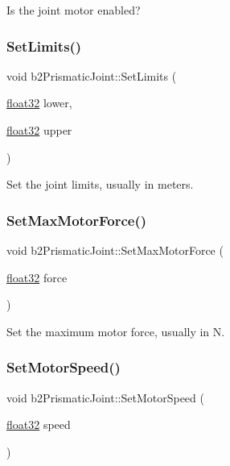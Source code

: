 Is the joint motor enabled? 

\mbox{\label{classb2_prismatic_joint_a82a220e6d5a212c1924882e0855b0bef}} 
\subsubsection{\texorpdfstring{SetLimits()}{SetLimits()}}
{\footnotesize\ttfamily void b2\+Prismatic\+Joint\+::\+Set\+Limits (\begin{DoxyParamCaption}\item[{\mbox{\hyperlink{b2_settings_8h_aacdc525d6f7bddb3ae95d5c311bd06a1}{float32}}}]{lower,  }\item[{\mbox{\hyperlink{b2_settings_8h_aacdc525d6f7bddb3ae95d5c311bd06a1}{float32}}}]{upper }\end{DoxyParamCaption})}



Set the joint limits, usually in meters. 

\mbox{\label{classb2_prismatic_joint_aa7817474aef15ca4815341479ac590e2}} 
\subsubsection{\texorpdfstring{SetMaxMotorForce()}{SetMaxMotorForce()}}
{\footnotesize\ttfamily void b2\+Prismatic\+Joint\+::\+Set\+Max\+Motor\+Force (\begin{DoxyParamCaption}\item[{\mbox{\hyperlink{b2_settings_8h_aacdc525d6f7bddb3ae95d5c311bd06a1}{float32}}}]{force }\end{DoxyParamCaption})}



Set the maximum motor force, usually in N. 

\mbox{\label{classb2_prismatic_joint_a602ef7a6ca4fca55d011f1b38ab5a6c3}} 
\subsubsection{\texorpdfstring{SetMotorSpeed()}{SetMotorSpeed()}}
{\footnotesize\ttfamily void b2\+Prismatic\+Joint\+::\+Set\+Motor\+Speed (\begin{DoxyParamCaption}\item[{\mbox{\hyperlink{b2_settings_8h_aacdc525d6f7bddb3ae95d5c311bd06a1}{float32}}}]{speed }\end{DoxyParamCaption})}




